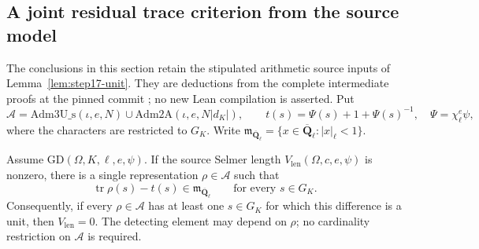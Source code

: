 \subsection{A joint residual trace criterion from the source model}
\label{sec:joint-trace-source}

The conclusions in this section retain the stipulated arithmetic source
inputs of Lemma~\ref{lem:step17-unit}. They are deductions from the
complete intermediate proofs at the pinned commit
\cite{K17PinnedLeanMirror}; no new Lean compilation is asserted. Put
\[
 \mathcal A=\mathrm{Adm3U\_s}(\iota,e,N)
       \cup\mathrm{Adm2A}(\iota,e,N|d_K|),\qquad
 t(s)=\Psi(s)+1+\Psi(s)^{-1},\quad \Psi=\chi_\ell^e\psi,
\]
where the characters are restricted to $G_K$. Write
$\mathfrak m_{\overline{\mathbf Q}_\ell}
 =\{x\in\overline{\mathbf Q}_\ell:|x|_\ell<1\}$.

\begin{theorem}[K17-S17-JOINT]\label{thm:step17-joint}
Assume $\mathrm{GD}(\Omega,K,\ell,e,\psi)$. If the source Selmer
length $V_{\mathrm{len}}(\Omega,c,e,\psi)$ is nonzero, there is a
single representation $\rho\in\mathcal A$ such that
\begin{equation}\label{eq:joint-global-congruence}
 \operatorname{tr}\rho(s)-t(s)
       \in\mathfrak m_{\overline{\mathbf Q}_\ell}
       \qquad\text{for every }s\in G_K.
\end{equation}
Consequently, if every $\rho\in\mathcal A$ has at least one $s\in G_K$
for which this difference is a unit, then $V_{\mathrm{len}}=0$.
The detecting element may depend on $\rho$; no cardinality restriction
on $\mathcal A$ is required.
\end{theorem}


